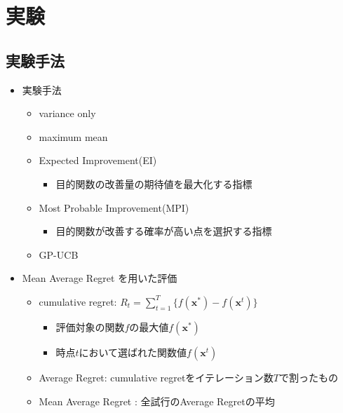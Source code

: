 \documentclass[dvipdfmx, 10.5pt]{beamer}
\begin{document}

\section{実験}



\subsection{実験手法}
\begin{frame}{\insertsubsection}
	\begin{itemize}
		\item 実験手法
		\begin{itemize}
			\vspace{5pt}
			\item variance only
			\vspace{2pt}
			\item maximum mean
			\vspace{2pt}
			\item Expected Improvement(EI)
			\begin{itemize}
				\item 目的関数の改善量の期待値を最大化する指標
			\end{itemize}
			\vspace{2pt}
			\item Most Probable Improvement(MPI)
			\begin{itemize}
				\item 目的関数が改善する確率が高い点を選択する指標
			\end{itemize}
			\vspace{2pt}
			\item \textcolor{myorange}{GP-UCB}
		\end{itemize}
		\vspace{15pt}
		\item \textcolor{myorange}{Mean Average Regret} を用いた評価
		\begin{itemize}
			\item cumulative regret: $R_t = \sum_{t=1}^T\{f(\bm x^*) - f(\bm x^t)\}$
			\begin{itemize}
				\vspace{1.5pt}
				\item $\mbox{評価対象の関数}f\mbox{の最大値}f(\bm x^*)$
				\vspace{1.5pt}
				\item $\mbox{時点}t\mbox{において選ばれた関数値}f(\bm x^t)$
			\end{itemize}
			\vspace{2pt}
			\item Average Regret: cumulative regretをイテレーション数$T$で割ったもの
			\vspace{2pt}
			\item \textcolor{myorange}{Mean Average Regret} : 全試行のAverage Regretの平均
		\end{itemize}
	\end{itemize}
\end{frame}
\end{document}
